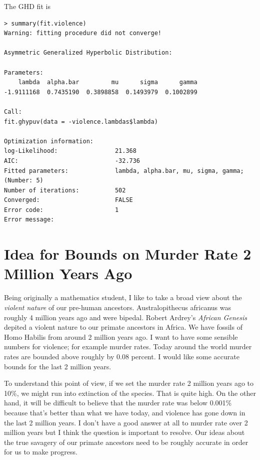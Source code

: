 \documentclass{amsart}
\begin{document}
The GHD fit is
\begin{verbatim}
> summary(fit.violence)
Warning: fitting procedure did not converge!

Asymmetric Generalized Hyperbolic Distribution:

Parameters:
    lambda  alpha.bar         mu      sigma      gamma 
-1.9111168  0.7435190  0.3898858  0.1493979  0.1002899 

Call:
fit.ghypuv(data = -violence.lambdas$lambda)

Optimization information:
log-Likelihood:                21.368 
AIC:                           -32.736 
Fitted parameters:             lambda, alpha.bar, mu, sigma, gamma;  (Number: 5)
Number of iterations:          502 
Converged:                     FALSE 
Error code:                    1 
Error message:       
\end{verbatim}

\section{Idea for Bounds on Murder Rate 2 Million Years Ago}

Being originally a mathematics student, I like to take a broad view about the {\em violent nature} of our pre-human ancestors.  Australopithecus africanus was roughly 4 million years ago and were bipedal.  Robert Ardrey's {\em African Genesis} depited a violent nature to our primate ancestors in Africa.  We have fossils of Homo Habilis from around 2 million years ago.  I want to have some sensible numbers for violence; for example murder rates.  Today around the world murder rates are bounded above roughly by 0.08 percent.  I would like some accurate bounds for the last 2 million years.  

To understand this point of view, if we set the murder rate 2 million years ago to 10\%, we might run into extinction of the species.  That is quite high.  On the other hand, it will be difficult to believe that the murder rate was below 0.001\% because that's better than what we have today, and violence has gone down in the last 2 million years. 
I don't have a good answer at all to murder rate over 2 million years but I think the question is important to resolve.  Our ideas about the true savagery of our primate ancestors need to be roughly accurate in order for us to make progress.
\end{document}

